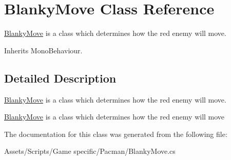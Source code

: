 \hypertarget{class_blanky_move}{\section{Blanky\-Move Class Reference}
\label{class_blanky_move}
}


\hyperlink{class_blanky_move}{Blanky\-Move} is a class which determines how the red enemy will move.  




Inherits Mono\-Behaviour.



\subsection{Detailed Description}
\hyperlink{class_blanky_move}{Blanky\-Move} is a class which determines how the red enemy will move. 

\hyperlink{class_blanky_move}{Blanky\-Move} is a class which determines how the red enemy will move 

The documentation for this class was generated from the following file\-:\begin{DoxyCompactItemize}
\item 
Assets/\-Scripts/\-Game specific/\-Pacman/Blanky\-Move.\-cs\end{DoxyCompactItemize}
